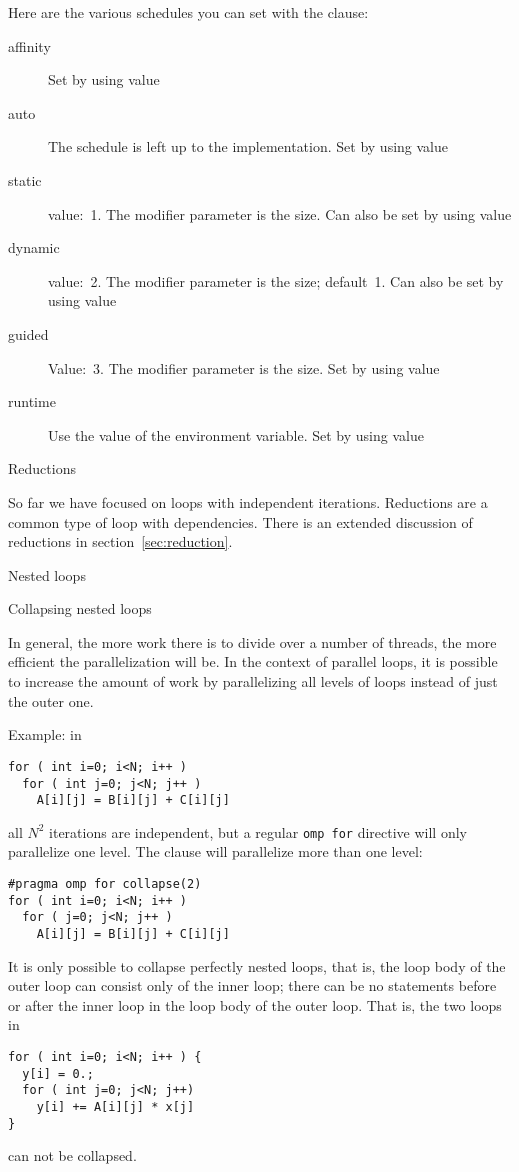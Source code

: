 Here are the various schedules you can set with the
 clause:
\begin{description}
  \item[affinity] Set by using value  
  \item[auto] The schedule is left up to the implementation. Set by
    using value 
  \item[static] value:~1. The modifier parameter is the  size.
    Can also be set by using value  
  \item[dynamic] value:~2. The modifier parameter is the
     size; default~1.
    Can also be set by using value
  \item[guided] Value:~3. The modifier parameter is the
     size. Set by using value
  \item[runtime] Use the value of the 
    environment variable. Set by using value
\end{description}

 {Reductions}

So far we have focused on loops with independent iterations.
Reductions are a common type of loop with dependencies.
There is an extended discussion of reductions in section~\ref{sec:reduction}.

 {Nested loops}

 {Collapsing nested loops}

In general, the more work there is to divide over a number of threads,
the more efficient the parallelization will be. In the context of
parallel loops, it is possible to increase the amount of work by
parallelizing all levels of loops instead of just the outer one.

Example: in
\begin{lstlisting}
for ( int i=0; i<N; i++ )
  for ( int j=0; j<N; j++ )
    A[i][j] = B[i][j] + C[i][j] 
\end{lstlisting}
all $N^2$ iterations are independent, but a regular \lstinline{omp for}
directive will only parallelize one level. The 
clause will parallelize more than one level:
\begin{lstlisting}
#pragma omp for collapse(2)
for ( int i=0; i<N; i++ )
  for ( j=0; j<N; j++ )
    A[i][j] = B[i][j] + C[i][j] 
\end{lstlisting}
It is only possible to collapse perfectly nested loops, that is, the
loop body of the outer loop can consist only of the inner loop; there
can be no statements before or after the inner loop in the loop body
of the outer loop. That is, the two loops in
\begin{lstlisting}
for ( int i=0; i<N; i++ ) {
  y[i] = 0.;
  for ( int j=0; j<N; j++)
    y[i] += A[i][j] * x[j]
}
\end{lstlisting}
can not be collapsed.

